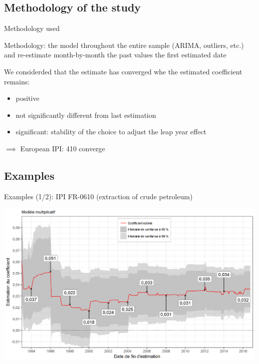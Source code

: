 \documentclass[10pt,xcolor=table,color={dvipsnames,usenames},ignorenonframetext,usepdftitle=false,french]{beamer}
\begin{document}
\subsection{Methodology of the study}\label{methodology-of-the-study}

\begin{frame}{Methodology used}

Methodology:  the model throughout the entire
sample (ARIMA, outliers, etc.) and re-estimate month-by-month the past
values  the first estimated date

\pause
\medskip
We considerded that the estimate has converged whe the estimated
coefficient remains:

\begin{itemize}
\item
  positive
\item
  not significantly different from last estimation
\item
  significant: stability of the choice to adjust the leap year effect
\end{itemize}

\(\implies\) European IPI: 410 converge

\end{frame}

\subsection{Examples}\label{examples}

\begin{frame}{Examples (1/2): IPI FR-0610 (extraction of crude
petroleum)}

\centering
\includegraphics[width = \textwidth]{img/LYexemple1.png}

\end{frame}
\end{document}
